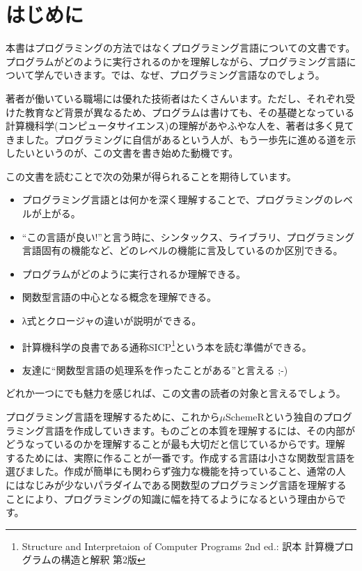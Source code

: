 

\chapter*{はじめに\hspace{-3mm}}

本書はプログラミングの方法ではなくプログラミング言語についての文書です。プログラムがどのように実行されるのかを理解しながら、プログラミング言語について学んでいきます。では、なぜ、プログラミング言語なのでしょう。

著者が働いている職場には優れた技術者はたくさんいます。ただし、それぞれ受けた教育など背景が異なるため、プログラムは書けても、その基礎となっている計算機科学(コンピュータサイエンス)の理解があやふやな人を、著者は多く見てきました。プログラミングに自信があるという人が、もう一歩先に進める道を示したいというのが、この文書を書き始めた動機です。

この文書を読むことで次の効果が得られることを期待しています。
\begin{itemize}
\item プログラミング言語とは何かを深く理解することで、プログラミングのレベルが上がる。
\item “この言語が良い!”と言う時に、シンタックス、ライブラリ、プログラミング言語固有の機能など、どのレベルの機能に言及しているのか区別できる。
\item プログラムがどのように実行されるか理解できる。
\item 関数型言語の中心となる概念を理解できる。
\item λ式とクロージャの違いが説明ができる。
\item 計算機科学の良書である通称SICP\footnote{Structure and Interpretaion of Computer Programs 2nd ed.: 訳本 計算機プログラムの構造と解釈 第2版}という本を読む準備ができる。
\item 友達に“関数型言語の処理系を作ったことがある”と言える ;-)
\end{itemize}
どれか一つにでも魅力を感じれば、この文書の読者の対象と言えるでしょう。

プログラミング言語を理解するために、これから$\mu$SchemeRという独自のプログ
ラミング言語を作成していきます。ものごとの本質を理解するには、その内部が
どうなっているのかを理解することが最も大切だと信じているからです。理解
するためには、実際に作ることが一番です。作成する言語は小さな関数型言語を
選びました。作成が簡単にも関わらず強力な機能を持っていること、通常の人
にはなじみが少ないパラダイムである関数型のプログラミング言語を理解する
ことにより、プログラミングの知識に幅を持てるようになるという理由からで
す。

